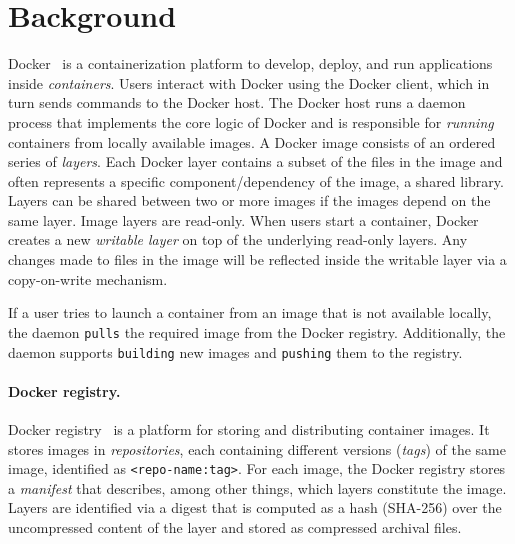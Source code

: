 \section{Background}
\label{sec:background}

Docker~\cite{docker} is a containerization platform to develop, deploy, and run applications inside \emph{containers}.
Users interact with Docker using the Docker client, which in turn sends commands to the Docker host.
The Docker host runs a daemon process that implements the core logic of Docker and is responsible for \emph{running} containers from locally available images.
A Docker image consists of an ordered series of \emph{layers}.
Each Docker layer contains a subset of the files in the image and often represents a specific component/dependency of the image, \eg a shared library.
Layers can be shared between two or more images if the images depend on the same layer.
Image layers are read-only.
When users start a container, Docker creates a new \emph{writable layer} on top of the underlying read-only layers.
Any changes made to files in the image will be reflected inside the writable layer via a copy-on-write mechanism.

If a user tries to launch a container from an image that is not available locally, the daemon \texttt{pulls} the required image from the Docker registry.
Additionally, the daemon supports \texttt{building} new images and \texttt{pushing} them to the registry.

\paragraph{Docker registry.} Docker registry~\cite{docker-hub} is a platform for storing and distributing container images.
It stores images in \emph{repositories}, each containing different versions (\emph{tags}) of the same image, identified as \texttt{<repo-name:tag>}.
For each image, the Docker registry stores a \emph{manifest} that describes, among other things, which layers constitute the image.
Layers are identified via a digest that is computed as a hash (SHA-256) over the uncompressed content of the layer and stored as compressed archival files.

